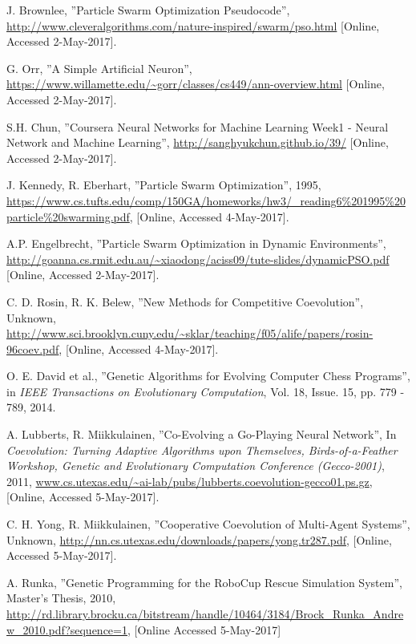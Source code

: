 \begin{thebibliography}{9}
J. Brownlee, ''Particle Swarm Optimization Pseudocode'', \url{http://www.cleveralgorithms.com/nature-inspired/swarm/pso.html} [Online, Accessed 2-May-2017].

G. Orr, ''A Simple Artificial Neuron'', \url{https://www.willamette.edu/~gorr/classes/cs449/ann-overview.html} [Online, Accessed 2-May-2017].

S.H. Chun, ''Coursera Neural Networks for Machine Learning Week1 - Neural Network and Machine Learning'', \url{http://sanghyukchun.github.io/39/} [Online, Accessed 2-May-2017].

J. Kennedy, R. Eberhart, ''Particle Swarm Optimization'', 1995, \url{https://www.cs.tufts.edu/comp/150GA/homeworks/hw3/_reading6\%201995\%20particle\%20swarming.pdf}, [Online, Accessed 4-May-2017].

A.P. Engelbrecht, ''Particle Swarm Optimization in Dynamic Environments'', \url{http://goanna.cs.rmit.edu.au/~xiaodong/aciss09/tute-slides/dynamicPSO.pdf} [Online, Accessed 2-May-2017].

C. D. Rosin, R. K. Belew, ''New Methods for Competitive Coevolution'', Unknown, \url{http://www.sci.brooklyn.cuny.edu/~sklar/teaching/f05/alife/papers/rosin-96coev.pdf}, [Online, Accessed 4-May-2017].

O. E. David et al., ''Genetic Algorithms for Evolving Computer Chess Programs'', in \textit{IEEE Transactions on Evolutionary Computation}, Vol. 18, Issue. 15, pp. 779 - 789, 2014.

A. Lubberts, R. Miikkulainen, ''Co-Evolving a Go-Playing Neural Network'', In \textit{Coevolution: Turning Adaptive Algorithms upon Themselves, Birds-of-a-Feather Workshop, Genetic and Evolutionary Computation Conference (Gecco-2001)}, 2011, \url{www.cs.utexas.edu/~ai-lab/pubs/lubberts.coevolution-gecco01.ps.gz}, [Online, Accessed 5-May-2017].

C. H. Yong, R. Miikkulainen, ''Cooperative Coevolution of Multi-Agent Systems'', Unknown, \url{http://nn.cs.utexas.edu/downloads/papers/yong.tr287.pdf}, [Online, Accessed 5-May-2017].

A. Runka, ''Genetic Programming for the RoboCup Rescue Simulation System'', Master's Thesis, 2010, \url{http://rd.library.brocku.ca/bitstream/handle/10464/3184/Brock_Runka_Andrew_2010.pdf?sequence=1}, [Online Accessed 5-May-2017]



\end{thebibliography}
